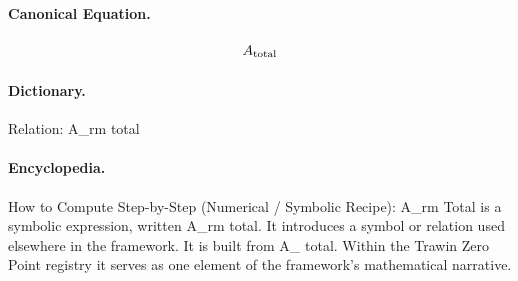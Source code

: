 \paragraph{Canonical Equation.}
\[
A_{\rm total}
\]

\paragraph{Dictionary.}
Relation: A\_rm total

\paragraph{Encyclopedia.}
How to Compute Step-by-Step (Numerical / Symbolic Recipe): A\_rm Total is a symbolic expression, written A\_rm total. It introduces a symbol or relation used elsewhere in the framework. It is built from A\_ total. Within the Trawin Zero Point registry it serves as one element of the framework's mathematical narrative.
